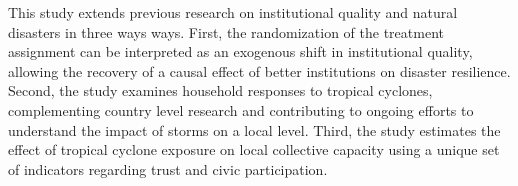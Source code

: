 \documentclass[12pt]{article}
\begin{document}
	This study extends previous research on institutional quality and natural disasters in three ways ways. First, the randomization of the treatment assignment can be interpreted as an exogenous shift in institutional quality, allowing the recovery of a causal effect of better institutions on disaster resilience. Second, the study examines household responses to tropical cyclones, complementing country level research and contributing to ongoing efforts to understand the impact of storms on a local level. Third, the study estimates the effect of tropical cyclone exposure on local collective capacity using a unique set of indicators regarding trust and civic participation. 



\end{document}

